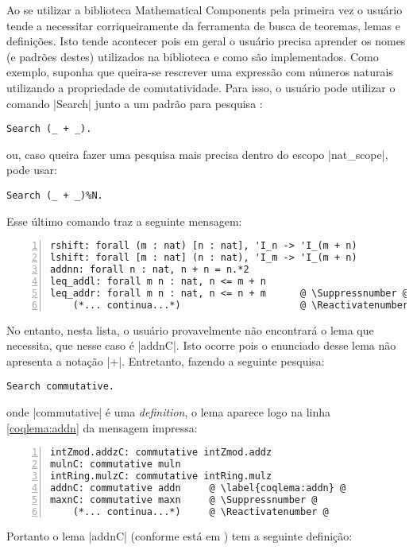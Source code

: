 Ao se utilizar a biblioteca Mathematical Components pela primeira vez o usuário tende a necessitar corriqueiramente da ferramenta de busca de teoremas, lemas e definições. Isto tende acontecer pois em geral o usuário precisa aprender os nomes (e padrões destes) utilizados na biblioteca e como são implementados. Como exemplo, suponha que queira-se rescrever uma expressão com números naturais utilizando a propriedade de comutatividade. Para isso, o usuário pode utilizar o comando \coqinline|Search| junto a um padrão para pesquisa \cite{assia_mahboubi_2022_7118596}:
    \begin{lstlisting}[language=coq,frame=single,tabsize=1]
Search (_ + _).
    \end{lstlisting}
ou, caso queira fazer uma pesquisa mais precisa dentro do escopo \coqinline|nat_scope|, pode usar:
    \begin{lstlisting}[language=coq,frame=single,tabsize=1]
Search (_ + _)%N.
    \end{lstlisting}
Esse último comando traz a seguinte mensagem:
    \begin{lstlisting}[language=coq-error,frame=single,tabsize=1, escapechar=@, escapechar=@, numbers=left]
rshift: forall (m : nat) [n : nat], 'I_n -> 'I_(m + n)
lshift: forall [m : nat] (n : nat), 'I_m -> 'I_(m + n)
addnn: forall n : nat, n + n = n.*2
leq_addl: forall m n : nat, n <= m + n
leq_addr: forall m n : nat, n <= n + m      @ \Suppressnumber @
    (*... continua...*)                     @ \Reactivatenumber @
    \end{lstlisting}
No entanto, nesta lista, o usuário provavelmente não encontrará o lema que necessita, que nesse caso é \coqinline|addnC|. Isto ocorre pois o enunciado desse lema não apresenta a notação \coqinline|+|. Entretanto, fazendo a seguinte pesquisa:
    \begin{lstlisting}[language=coq,frame=single,tabsize=1]
Search commutative.
    \end{lstlisting}
onde \coqinline|commutative| é uma \textit{definition},
o lema aparece logo na linha \ref{coqlema:addn} da mensagem impressa: 
    \begin{lstlisting}[language=coq-error,frame=single,tabsize=1, escapechar=@, numbers=left]
intZmod.addzC: commutative intZmod.addz
mulnC: commutative muln
intRing.mulzC: commutative intRing.mulz
addnC: commutative addn     @ \label{coqlema:addn} @
maxnC: commutative maxn     @ \Suppressnumber @
    (*... continua...*)     @ \Reactivatenumber @
    \end{lstlisting}
Portanto o lema \coqinline|addnC| (conforme está em \cite{mathcomp-ssrnat}) tem a seguinte definição:
